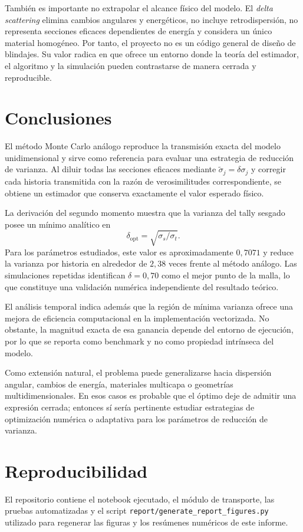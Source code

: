 \documentclass[11pt]{article}
\begin{document}
También es importante no extrapolar el alcance físico del modelo. El \textit{delta scattering} elimina cambios angulares y energéticos, no incluye retrodispersión, no representa secciones eficaces dependientes de energía y considera un único material homogéneo. Por tanto, el proyecto no es un código general de diseño de blindajes. Su valor radica en que ofrece un entorno donde la teoría del estimador, el algoritmo y la simulación pueden contrastarse de manera cerrada y reproducible.

\section{Conclusiones}
El método Monte Carlo análogo reproduce la transmisión exacta del modelo unidimensional y sirve como referencia para evaluar una estrategia de reducción de varianza. Al diluir todas las secciones eficaces mediante $\tilde\sigma_j=\delta\sigma_j$ y corregir cada historia transmitida con la razón de verosimilitudes correspondiente, se obtiene un estimador que conserva exactamente el valor esperado físico.

La derivación del segundo momento muestra que la varianza del tally sesgado posee un mínimo analítico en
\begin{equation*}
    \delta_{\mathrm{opt}}=\sqrt{\sigma_s/\sigma_t}.
\end{equation*}
Para los parámetros estudiados, este valor es aproximadamente $0{,}7071$ y reduce la varianza por historia en alrededor de $2{,}38$ veces frente al método análogo. Las simulaciones repetidas identifican $\delta=0{,}70$ como el mejor punto de la malla, lo que constituye una validación numérica independiente del resultado teórico.

El análisis temporal indica además que la región de mínima varianza ofrece una mejora de eficiencia computacional en la implementación vectorizada. No obstante, la magnitud exacta de esa ganancia depende del entorno de ejecución, por lo que se reporta como benchmark y no como propiedad intrínseca del modelo.

Como extensión natural, el problema puede generalizarse hacia dispersión angular, cambios de energía, materiales multicapa o geometrías multidimensionales. En esos casos es probable que el óptimo deje de admitir una expresión cerrada; entonces sí sería pertinente estudiar estrategias de optimización numérica o adaptativa para los parámetros de reducción de varianza.

\section*{Reproducibilidad}
El repositorio contiene el notebook ejecutado, el módulo de transporte, las pruebas automatizadas y el script \texttt{report/generate\_report\_figures.py} utilizado para regenerar las figuras y los resúmenes numéricos de este informe.
\end{document}
